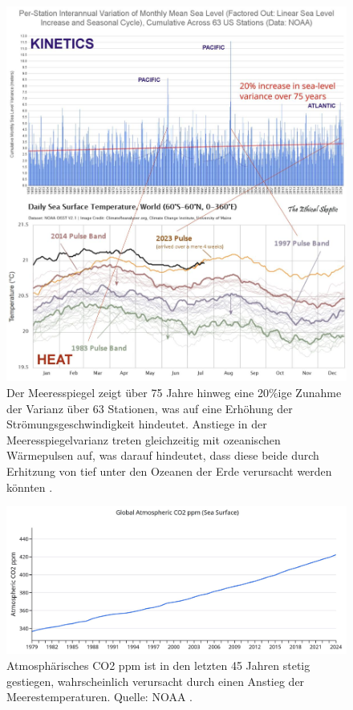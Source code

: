 \documentclass[10pt,twocolumn,letterpaper]{article}
\begin{document}
\begin{figure}[t]
\begin{center}
\includegraphics[width=1\textwidth]{sealevel.jpeg}
\end{center}
   \caption{Der Meeresspiegel zeigt über 75 Jahre hinweg eine 20\%ige Zunahme der Varianz über 63 Stationen, was auf eine Erhöhung der Strömungsgeschwindigkeit hindeutet. Anstiege in der Meeresspiegelvarianz treten gleichzeitig mit ozeanischen Wärmepulsen auf, was darauf hindeutet, dass diese beide durch Erhitzung von tief unter den Ozeanen der Erde verursacht werden könnten \cite{2,129}.}
\label{fig:22}
\end{figure}
\begin{figure}[t]
\begin{center}
\includegraphics[width=1\textwidth]{co2.jpg}
\end{center}
   \caption{Atmosphärisches CO2 ppm ist in den letzten 45 Jahren stetig gestiegen, wahrscheinlich verursacht durch einen Anstieg der Meerestemperaturen. Quelle: NOAA \cite{148,129}.}
\label{fig:23}
\end{figure}
\end{document}
